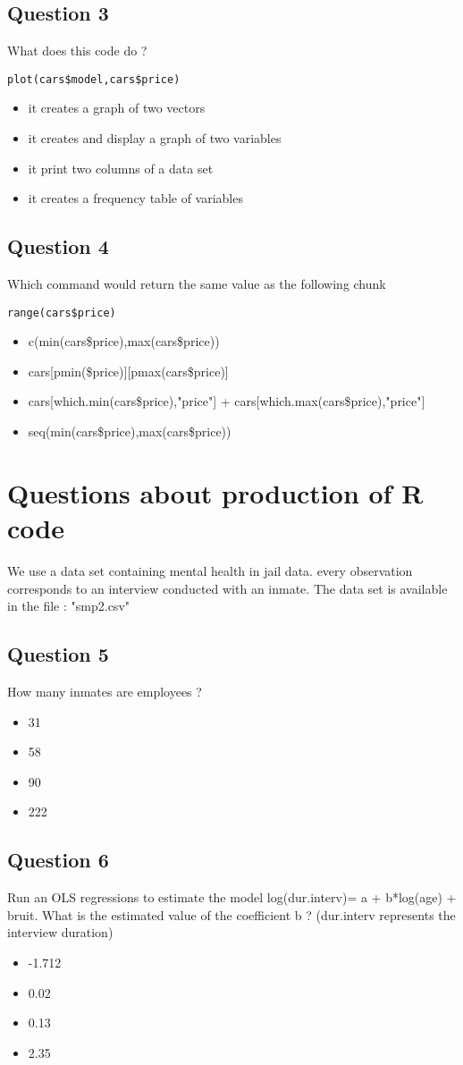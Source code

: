 \documentclass[11pt]{article}
\begin{document}
\subsection*{Question 3}
\label{sec:orgd6da281}
What does this code do ?
\begin{verbatim}
plot(cars$model,cars$price)
\end{verbatim}
\begin{itemize}
\item it creates a graph of two vectors
\item it creates and display a graph of two variables
\item it print two columns of a data set
\item it creates a frequency table of variables
\end{itemize}
\subsection*{Question 4}
\label{sec:org6dd3365}
Which command would return the same value as the following chunk
\begin{verbatim}
range(cars$price)
\end{verbatim}
\begin{itemize}
\item c(min(cars\$price),max(cars\$price))
\item cars[pmin(\$price)][pmax(cars\$price)]
\item cars[which.min(cars\$price),"price"] + cars[which.max(cars\$price),"price"]
\item seq(min(cars\$price),max(cars\$price))
\end{itemize}
\section*{Questions about production of R code}
\label{sec:org2761180}
We use a data set containing mental health in jail data. every observation
corresponds to an interview conducted with an inmate. The data set is available
in the file : "smp2.csv"
\subsection*{Question 5}
\label{sec:orgb334e8c}
How many inmates are employees ?
\begin{itemize}
\item 31
\item 58
\item 90
\item 222
\end{itemize}
\subsection*{Question 6}
\label{sec:org06983ae}
Run an OLS regressions to estimate the model log(dur.interv)= a + b*log(age) + bruit. What is the estimated
value of the coeﬃcient b ? (dur.interv represents the interview duration)
\begin{itemize}
\item -1.712
\item 0.02
\item 0.13
\item 2.35
\end{itemize}
\end{document}
